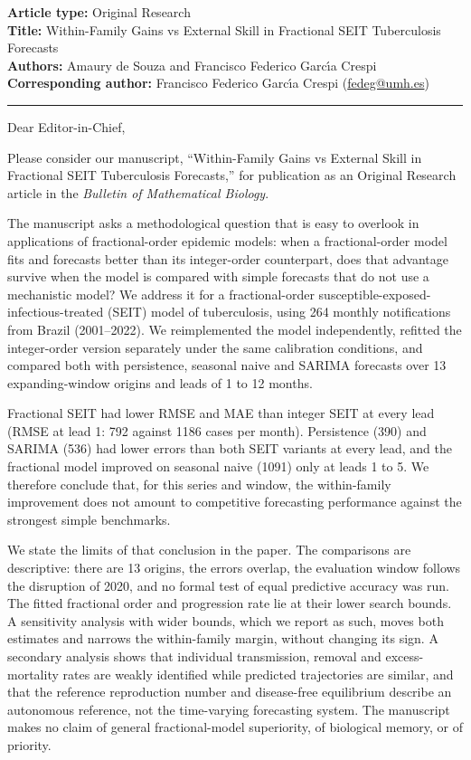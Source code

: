 \documentclass[11pt,a4paper]{article}
\begin{document}
\pagestyle{empty}

\noindent\textbf{Article type:} Original Research\\
\textbf{Title:} Within-Family Gains vs External Skill in Fractional SEIT Tuberculosis Forecasts\\
\textbf{Authors:} Amaury de Souza and Francisco Federico Garc\'{\i}a Crespi\\
\textbf{Corresponding author:} Francisco Federico Garc\'{\i}a Crespi (\href{mailto:fedeg@umh.es}{fedeg@umh.es})

\hrule
\bigskip

Dear Editor-in-Chief,

Please consider our manuscript, ``Within-Family Gains vs External Skill in Fractional SEIT Tuberculosis Forecasts,'' for publication as an Original Research article in the \emph{Bulletin of Mathematical Biology}.

The manuscript asks a methodological question that is easy to overlook in applications of fractional-order epidemic models: when a fractional-order model fits and forecasts better than its integer-order counterpart, does that advantage survive when the model is compared with simple forecasts that do not use a mechanistic model? We address it for a fractional-order susceptible-exposed-infectious-treated (SEIT) model of tuberculosis, using 264 monthly notifications from Brazil (2001--2022). We reimplemented the model independently, refitted the integer-order version separately under the same calibration conditions, and compared both with persistence, seasonal naive and SARIMA forecasts over 13 expanding-window origins and leads of 1 to 12 months.

Fractional SEIT had lower RMSE and MAE than integer SEIT at every lead (RMSE at lead 1: 792 against 1186 cases per month). Persistence (390) and SARIMA (536) had lower errors than both SEIT variants at every lead, and the fractional model improved on seasonal naive (1091) only at leads 1 to 5. We therefore conclude that, for this series and window, the within-family improvement does not amount to competitive forecasting performance against the strongest simple benchmarks.

We state the limits of that conclusion in the paper. The comparisons are descriptive: there are 13 origins, the errors overlap, the evaluation window follows the disruption of 2020, and no formal test of equal predictive accuracy was run. The fitted fractional order and progression rate lie at their lower search bounds. A sensitivity analysis with wider bounds, which we report as such, moves both estimates and narrows the within-family margin, without changing its sign. A secondary analysis shows that individual transmission, removal and excess-mortality rates are weakly identified while predicted trajectories are similar, and that the reference reproduction number and disease-free equilibrium describe an autonomous reference, not the time-varying forecasting system. The manuscript makes no claim of general fractional-model superiority, of biological memory, or of priority.
\end{document}
